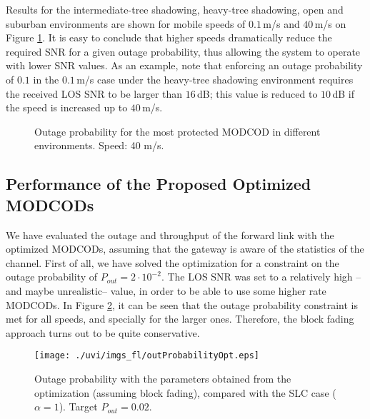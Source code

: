 \documentclass[journal,onecolumn,10pt,a4paper]{IEEEtran}
\begin{document}
Results for the intermediate-tree shadowing, heavy-tree shadowing, open and suburban environments are shown for mobile speeds of $0.1$\,m/s and $40$\,m/s on Figure \ref{f:outage-40ms}. It is easy to conclude that higher speeds dramatically reduce the required SNR for a given outage probability, thus allowing the system to operate with lower SNR values. As an example, note that enforcing an outage probability of $0.1$ in the $0.1$\,m/s case under the heavy-tree shadowing environment requires the received LOS SNR to be larger than $16$\,dB; this value is reduced to $10$\,dB if the speed is increased up to $40$\,m/s.







\begin{figure}
\hspace{-.7cm}
\hspace*{-0.9cm}
\caption{Outage probability for the most protected MODCOD in different environments. Speed: 40 m/s.}
\label{f:outage-40ms}
\end{figure}


\subsection{Performance of the Proposed Optimized MODCODs}

We have evaluated the outage and throughput of the forward link with the optimized MODCODs, assuming that the gateway is aware of the statistics of the channel. First of all, we have solved the optimization for a constraint on the outage probability of $P_{out} = 2\cdot10^{-2}$. The LOS SNR was set to a relatively high --and maybe unrealistic-- value, in order to be able to use some higher rate MODCODs. In Figure \ref{outProbabilityOpt}, it can be seen that the outage probability constraint is met for all speeds, and specially for the larger ones. Therefore, the block fading approach turns out to be quite conservative.
 
\begin{figure}
\begin{center}

 \texttt{[image: ./uvi/imgs\_fl/outProbabilityOpt.eps]}
\caption{Outage probability with the parameters obtained from the optimization (assuming block fading), compared with the SLC case ($\alpha=1$). Target $P_{out} = 0.02$.}

\label{outProbabilityOpt}\end{center}
\end{figure}
\end{document}
